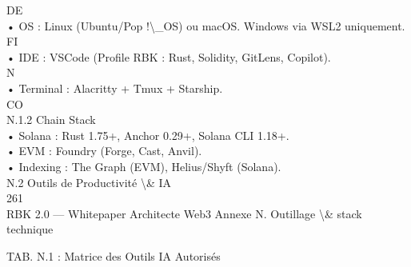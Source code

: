 \vspace{0.5em}
\vspace{0.5em}
\vspace{0.5em}
DE\\
• OS : Linux (Ubuntu/Pop !\textbackslash{}_OS) ou macOS. Windows via WSL2 uniquement.\\
\vspace{0.5em}
\vspace{0.5em}
\vspace{0.5em}
\vspace{0.5em}
FI\\
• IDE : VSCode (Profile RBK : Rust, Solidity, GitLens, Copilot).\\
\vspace{0.5em}
\vspace{0.5em}
\vspace{0.5em}
N\\
• Terminal : Alacritty + Tmux + Starship.\\
CO\\
N.1.2 Chain Stack\\
• Solana : Rust 1.75+, Anchor 0.29+, Solana CLI 1.18+.\\
\vspace{0.5em}
• EVM : Foundry (Forge, Cast, Anvil).\\
\vspace{0.5em}
• Indexing : The Graph (EVM), Helius/Shyft (Solana).\\
\vspace{0.5em}
\vspace{0.5em}
\vspace{0.5em}
N.2 Outils de Productivité \textbackslash{}& IA\\
\vspace{0.5em}
\vspace{0.5em}
261\\
RBK 2.0 — Whitepaper Architecte Web3                                                                   Annexe N. Outillage \textbackslash{}& stack technique\\
\vspace{0.5em}
\vspace{0.5em}
\vspace{0.5em}
\vspace{0.5em}
\begin{center}\begin{tabular}TAB. N.1 : Matrice des Outils IA Autorisés\end{tabular}\end{center}
\vspace{0.5em}
